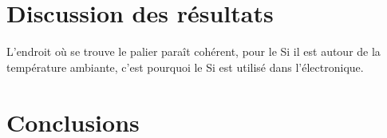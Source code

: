 \section*{Discussion des résultats}

L'endroit où se trouve le palier paraît cohérent, pour le Si il est autour de la température ambiante, c'est pourquoi le Si est utilisé dans l'électronique.




\section*{Conclusions}


